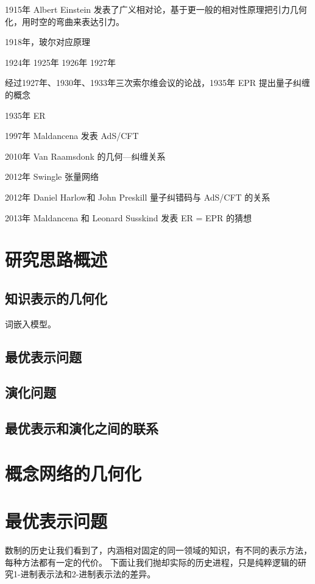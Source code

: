 \documentclass[a4paper,12pt]{article}
\begin{document}
1915年 Albert Einstein 发表了广义相对论，基于更一般的相对性原理把引力几何化，用时空的弯曲来表达引力。

1918年，玻尔对应原理

1924年
1925年
1926年
1927年

经过1927年、1930年、1933年三次索尔维会议的论战，1935年 EPR 提出量子纠缠的概念

1935年 ER

1997年 Maldancena 发表 AdS/CFT

2010年 Van Raamsdonk 的几何—纠缠关系

2012年 Swingle 张量网络

2012年 Daniel Harlow和 John Preskill 量子纠错码与 AdS/CFT 的关系

2013年 Maldancena 和 Leonard Susskind 发表 ER = EPR 的猜想

\section{研究思路概述}

\subsection{知识表示的几何化}

词嵌入模型。

\subsection{最优表示问题}

\subsection{演化问题}

\subsection{最优表示和演化之间的联系}

\section{概念网络的几何化}

\section{最优表示问题}

数制的历史让我们看到了，内涵相对固定的同一领域的知识，有不同的表示方法，每种方法都有一定的代价。
下面让我们抛却实际的历史进程，只是纯粹逻辑的研究1-进制表示法和2-进制表示法的差异。
\end{document}
